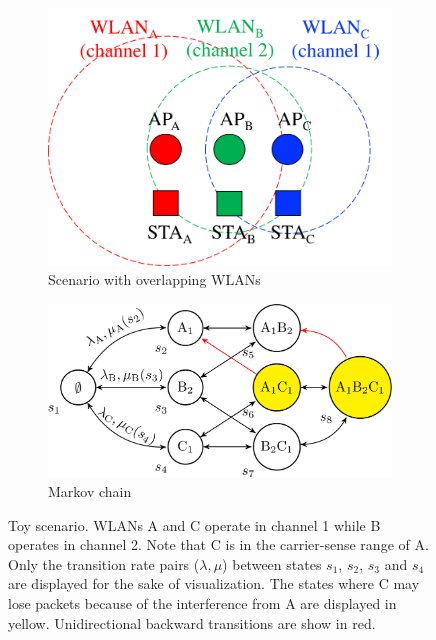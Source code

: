 \documentclass{article}
\begin{document}
\begin{figure}[h!]
	\centering		
	\begin{subfigure}[b]{0.35\textwidth}
		\includegraphics[width=\textwidth]{three_wlans_ctmn_a}
		\caption{Scenario with overlapping WLANs}\label{fig:three_wlans_ctmn_a}
	\end{subfigure}
	\begin{subfigure}[b]{0.5\textwidth}
		\includegraphics[width=\textwidth]{three_wlans_ctmn_b}
		\caption{Markov chain}\label{fig:three_wlans_ctmn_b}
	\end{subfigure}
	\caption{Toy scenario. WLANs A and C operate in channel 1 while B operates in channel 2. Note that C is in the carrier-sense range of A. Only the transition rate pairs ($\lambda, \mu$) between states $s_1$, $s_2$, $s_3$ and $s_4$ are displayed for the sake of visualization. The states where C may lose packets because of the interference from A are displayed in yellow. Unidirectional backward transitions are show in red.}    
	\label{fig:three_wlans_ctmn}
\end{figure}
\end{document}
